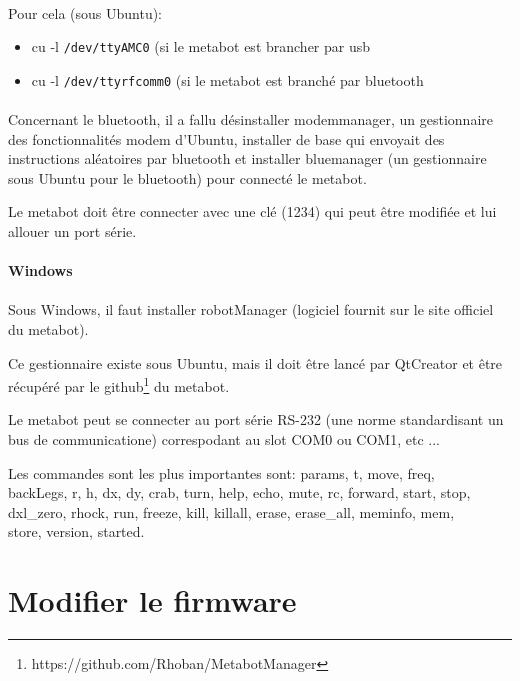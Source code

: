 \documentclass[10pt,a4paper]{report}
\begin{document}
\paragraph{}
Pour cela (sous Ubuntu): 
\begin{itemize}
\item cu -l \texttt{/dev/ttyAMC0} (si le metabot est brancher par usb
\item cu -l \texttt{/dev/ttyrfcomm0} (si le metabot est branché par bluetooth
\end{itemize}
\paragraph{}
Concernant le bluetooth, il a fallu désinstaller modemmanager, un gestionnaire des fonctionnalités modem d'Ubuntu, installer de base qui envoyait des instructions aléatoires par bluetooth et installer bluemanager (un gestionnaire sous Ubuntu pour le bluetooth) pour connecté le metabot.

Le metabot doit être connecter avec une clé (1234) qui peut être modifiée et lui allouer un port série.
\paragraph{Windows}
\paragraph{}
Sous Windows, il faut installer robotManager (logiciel fournit sur le site officiel du metabot).

Ce gestionnaire existe sous Ubuntu, mais il doit être lancé par QtCreator et être récupéré par le github\footnote{https://github.com/Rhoban/MetabotManager} du metabot.

Le metabot peut se connecter au port série RS-232 (une norme standardisant un bus de communicatione) correspodant au slot COM0 ou COM1, etc ...

Les commandes sont les plus importantes sont: params,  t, move, freq, \\backLegs, r, h, dx, dy, crab, turn, help, echo, mute, rc, forward, start, stop,\\ dxl\_zero, rhock, run, freeze, kill, killall, erase, erase\_all, meminfo, mem, \\store, version, started.

\section{Modifier le firmware}
\end{document}
